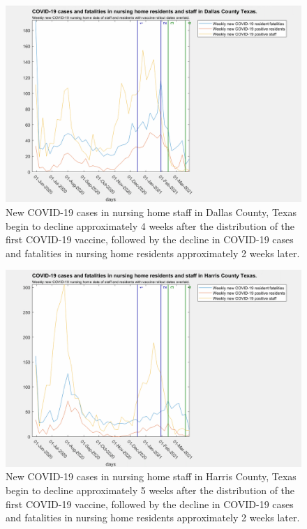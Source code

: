 \documentclass[twoside]{article}
\begin{document}
\begin{multicols}{2}
\begin{figure}[H]
	\includegraphics[width=\linewidth]{images/dallas_nursing_home_with_vaccine.png}
	\caption{New COVID-19 cases in nursing home staff in Dallas County, Texas begin to decline approximately 4 weeks after the distribution of the first COVID-19 vaccine, followed by the decline in COVID-19 cases and fatalities in nursing home residents approximately 2 weeks later.  }
	\label{fig:images/dallas_nursing_home_with_vaccineLabel}
\end{figure}

\begin{figure}[H]
	\includegraphics[width=\linewidth]{images/harris_nursing_home_with_vaccine.png}
	\caption{New COVID-19 cases in nursing home staff in Harris County, Texas begin to decline approximately 5 weeks after the distribution of the first COVID-19 vaccine, followed by the decline in COVID-19 cases and fatalities in nursing home residents approximately 2 weeks later. }
	\label{fig:images/harris_nursing_home_with_vaccineLabel}
\end{figure}


\end{multicols}
\end{document}
